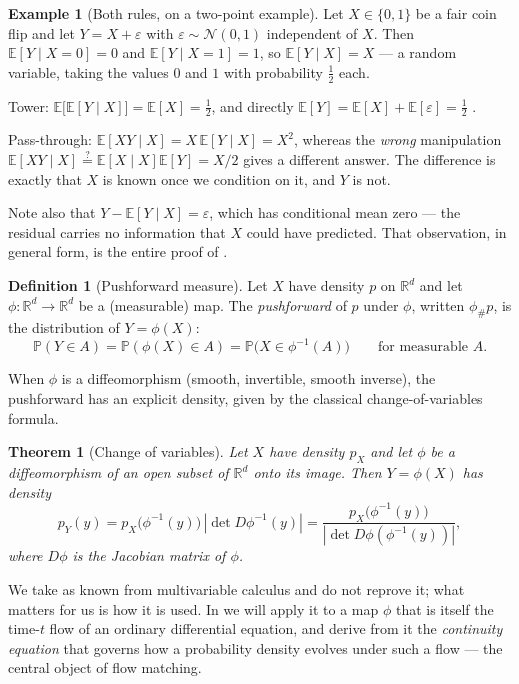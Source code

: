 \documentclass[11pt,a4paper]{report}
\newtheorem{theorem}{Theorem}[chapter]
\theoremstyle{definition}
\newtheorem{definition}[definition]{Definition}
\newtheorem{example}[example]{Example}
\theoremstyle{remark}
\newcommand{\RR}{\mathbb R}
\newcommand{\EE}{\mathbb E}
\newcommand{\PP}{\mathbb P}
\newcommand{\eps}{\varepsilon}
\begin{document}
\begin{example}[Both rules, on a two-point example]
\label{ex:cond-exp-toy}
Let $X\in\{0,1\}$ be a fair coin flip and let $Y=X+\eps$ with
$\eps\sim\mathcal N(0,1)$ independent of $X$. Then
$\EE[Y\mid X=0]=0$ and $\EE[Y\mid X=1]=1$, so $\EE[Y\mid X]=X$ --- a random
variable, taking the values $0$ and $1$ with probability $\tfrac12$ each.

Tower: $\EE\bigl[\EE[Y\mid X]\bigr]=\EE[X]=\tfrac12$, and directly
$\EE[Y]=\EE[X]+\EE[\eps]=\tfrac12$ \checkmark.

Pass-through: $\EE[XY\mid X]=X\,\EE[Y\mid X]=X^2$, whereas the \emph{wrong}
manipulation $\EE[XY\mid X]\overset{?}{=}\EE[X\mid X]\EE[Y]=X/2$ gives a
different answer. The difference is exactly that $X$ is known once we
condition on it, and $Y$ is not.

Note also that $Y-\EE[Y\mid X]=\eps$, which has conditional mean zero ---
the residual carries no information that $X$ could have predicted. That
observation, in general form, is the entire proof of
.
\end{example}

\begin{definition}[Pushforward measure]
\label{def:pushforward}
Let $X$ have density $p$ on $\RR^d$ and let $\phi:\RR^d\to\RR^d$ be a
(measurable) map. The \emph{pushforward} of $p$ under $\phi$, written
$\phi_{\#}p$, is the distribution of $Y=\phi(X)$:
\[
\PP(Y\in A) = \PP(\phi(X)\in A) = \PP\bigl(X\in\phi^{-1}(A)\bigr)
\qquad\text{for measurable } A.
\]
\end{definition}

When $\phi$ is a diffeomorphism (smooth, invertible, smooth inverse), the
pushforward has an explicit density, given by the classical
change-of-variables formula.

\begin{theorem}[Change of variables]
\label{thm:change-of-variables}
Let $X$ have density $p_X$ and let $\phi$ be a diffeomorphism of an open
subset of $\RR^d$ onto its image. Then $Y=\phi(X)$ has density
\[
p_Y(y) = p_X\bigl(\phi^{-1}(y)\bigr)\,
\left|\det D\phi^{-1}(y)\right|
=
\frac{p_X\bigl(\phi^{-1}(y)\bigr)}{\left|\det D\phi(\phi^{-1}(y))\right|},
\]
where $D\phi$ is the Jacobian matrix of $\phi$.
\end{theorem}

We take  as known from multivariable calculus
and do not reprove it; what matters for us is how it is used. In
 we will apply it to a map $\phi$ that is itself the
time-$t$ flow of an ordinary differential equation, and derive from it the
\emph{continuity equation} that governs how a probability density evolves
under such a flow --- the central object of flow matching.
\end{document}
